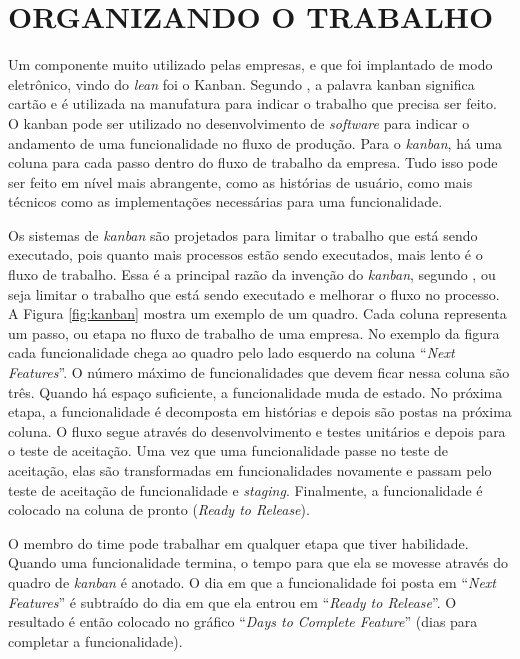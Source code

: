 \section{ORGANIZANDO O TRABALHO}

Um componente muito utilizado pelas empresas, e que foi implantado de modo eletrônico, vindo do \textit{lean} foi o Kanban. Segundo , a palavra kanban significa cartão e é utilizada na manufatura para indicar o trabalho que precisa ser feito. O kanban pode ser utilizado no desenvolvimento de \textit{software} para indicar o andamento de uma funcionalidade no fluxo de produção. Para o \textit{kanban}, há uma coluna para cada passo dentro do fluxo de trabalho da empresa. Tudo isso pode ser feito em nível mais abrangente, como as histórias de usuário, como mais técnicos como as implementações necessárias para uma funcionalidade.

Os sistemas de \textit{kanban} são projetados para limitar o trabalho que está sendo executado, pois quanto mais processos estão sendo executados, mais lento é o fluxo de trabalho. Essa é a principal razão da invenção do \textit{kanban}, segundo , ou seja limitar o trabalho que está sendo executado e melhorar o fluxo no processo. A Figura \ref{fig:kanban} mostra um exemplo de um quadro. Cada coluna representa um passo, ou etapa no fluxo de trabalho de uma empresa. No exemplo da figura cada funcionalidade chega ao quadro pelo lado esquerdo na coluna ``\textit{Next Features}''. O número máximo de funcionalidades que devem ficar nessa coluna são três. Quando há  espaço suficiente, a funcionalidade muda de estado. No próxima etapa, a funcionalidade é decomposta em histórias e depois são postas na próxima coluna. O fluxo segue através do desenvolvimento e testes unitários e depois para o teste de aceitação. Uma vez que uma funcionalidade passe no teste de aceitação, elas são transformadas em funcionalidades novamente e passam pelo teste de aceitação de funcionalidade e \textit{staging}. Finalmente, a funcionalidade é colocado na coluna de pronto (\textit{Ready to Release}).

O membro do time pode trabalhar em qualquer etapa que tiver habilidade. Quando uma funcionalidade termina, o tempo para que ela se movesse através do quadro de \textit{kanban} é anotado. O dia em que a funcionalidade foi posta em ``\textit{Next Features}'' é subtraído do dia em que ela entrou em ``\textit{Ready to Release}''. O resultado é então colocado no gráfico ``\textit{Days to Complete Feature}'' (dias para completar a funcionalidade).

